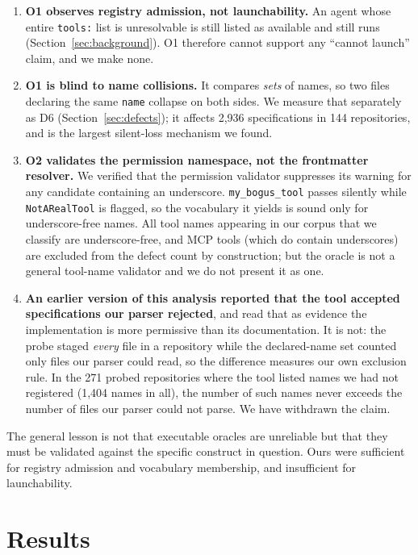 \documentclass[smallextended,natbib]{svjour3}
\newcommand{\code}[1]{\texttt{\small #1}}
\begin{document}
\begin{enumerate}\itemsep3pt
  \item \textbf{O1 observes registry admission, not launchability.} An agent whose entire
        \code{tools:} list is unresolvable is still listed as available and still runs
        (Section~\ref{sec:background}). O1 therefore cannot support any ``cannot launch'' claim, and
        we make none.
  \item \textbf{O1 is blind to name collisions.} It compares \emph{sets} of names, so two files
        declaring the same \code{name} collapse on both sides. We measure that separately as D6
        (Section~\ref{sec:defects}); it affects 2{,}936 specifications in 144 repositories, and is
        the largest silent-loss mechanism we found.
  \item \textbf{O2 validates the permission namespace, not the frontmatter resolver.} We verified
        that the permission validator suppresses its warning for any candidate containing an
        underscore. \code{my\_bogus\_tool} passes silently while \code{NotARealTool} is flagged, so
        the vocabulary it yields is sound only for underscore-free names. All tool names appearing in
        our corpus that we classify are underscore-free, and MCP tools (which do contain underscores)
        are excluded from the defect count by construction; but the oracle is not a general
        tool-name validator and we do not present it as one.
  \item \textbf{An earlier version of this analysis reported that the tool accepted specifications
        our parser rejected}, and read that as evidence the implementation is more permissive than
        its documentation. It is not: the probe staged \emph{every} file in a repository while the
        declared-name set counted only files our parser could read, so the difference measures our
        own exclusion rule. In the 271 probed repositories where the tool listed names we had not
        registered (1{,}404 names in all), the number of such names never exceeds the number of files
        our parser could not parse. We have withdrawn the claim.
\end{enumerate}

The general lesson is not that executable oracles are unreliable but that they must be validated
against the specific construct in question. Ours were sufficient for registry admission and
vocabulary membership, and insufficient for launchability.

\section{Results}
\label{sec:results}
\end{document}
